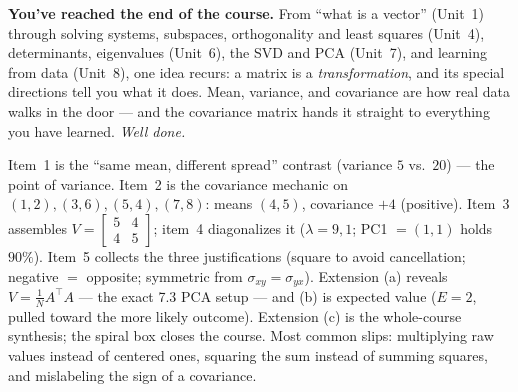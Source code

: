 \documentclass[10pt]{article}
\begin{document}
\begin{extensionbox}
\end{extensionbox}

\begin{spiralbox}
\textbf{You've reached the end of the course.} From ``what is a vector'' (Unit~1) through solving systems,
subspaces, orthogonality and least squares (Unit~4), determinants, eigenvalues (Unit~6), the SVD and PCA
(Unit~7), and learning from data (Unit~8), one idea recurs: a matrix is a \emph{transformation}, and its special
directions tell you what it does. Mean, variance, and covariance are how real data walks in the door --- and the
covariance matrix hands it straight to everything you have learned. \emph{Well done.}
\end{spiralbox}

\begin{teachernote}
Item~1 is the ``same mean, different spread'' contrast (variance $5$ vs.\ $20$) --- the point of variance.
Item~2 is the covariance mechanic on $(1,2),(3,6),(5,4),(7,8)$: means $(4,5)$, covariance $+4$ (positive).
Item~3 assembles $V=\left[\begin{smallmatrix}5&4\\4&5\end{smallmatrix}\right]$; item~4 diagonalizes it
($\lambda=9,1$; PC1 $=(1,1)$ holds $90\%$). Item~5 collects the three justifications (square to avoid
cancellation; negative $=$ opposite; symmetric from $\sigma_{xy}=\sigma_{yx}$). Extension (a) reveals
$V=\frac1N A^{\top}\!A$ --- the exact 7.3 PCA setup --- and (b) is expected value ($E=2$, pulled toward the more
likely outcome). Extension (c) is the whole-course synthesis; the spiral box closes the course. Most common
slips: multiplying raw values instead of centered ones, squaring the sum instead of summing squares, and
mislabeling the sign of a covariance.
\end{teachernote}
\end{document}
